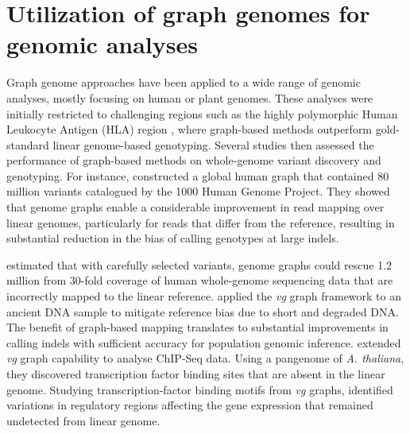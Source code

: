 \documentclass[../main.tex]{subfiles}
\begin{document}
\section[Utilization of the graph genomes]{Utilization of graph genomes for genomic analyses}

Graph genome approaches have been applied to a wide range of genomic analyses, mostly focusing on human or plant genomes. These analyses were initially restricted to challenging regions such as the highly polymorphic Human Leukocyte Antigen (HLA) region \citep{dilthey2015improved,lee2018kourami}, where graph-based methods outperform gold-standard linear genome-based genotyping. Several studies \citep{eggertsson2017graphtyper,garrison2018variation,sibbesen2018accurate,rakocevic2019fast} then assessed the performance of graph-based methods on whole-genome variant discovery and genotyping. For instance, \citet{garrison2018variation} constructed a global human graph that contained 80 million variants catalogued by the 1000 Human Genome Project. They showed that genome graphs enable a considerable improvement in read mapping over linear genomes, particularly for reads that differ from the reference, resulting in substantial reduction in the bias of calling genotypes at large indels. 

\citet{pritt2018forge} estimated that with carefully selected variants, genome graphs could rescue 1.2 million from 30-fold coverage of human whole-genome sequencing data that are incorrectly mapped to the linear reference. \citet{martiniano2019removing} applied the \emph{vg} graph framework to an ancient DNA sample to mitigate reference bias due to short and degraded DNA. The benefit of graph-based mapping translates to substantial improvements in calling indels with sufficient accuracy for population genomic inference. \citet{grytten2019graph} extended \emph{vg} graph capability to analyse ChIP-Seq data. Using a pangenome  of \emph{A. thaliana}, they discovered transcription factor binding sites that are absent in the linear genome. Studying transcription-factor binding motifs from \emph{vg} graphs, \citet{tognon2021grafimo} identified variations in regulatory regions affecting the gene expression that remained undetected from linear genome. 
\end{document}
